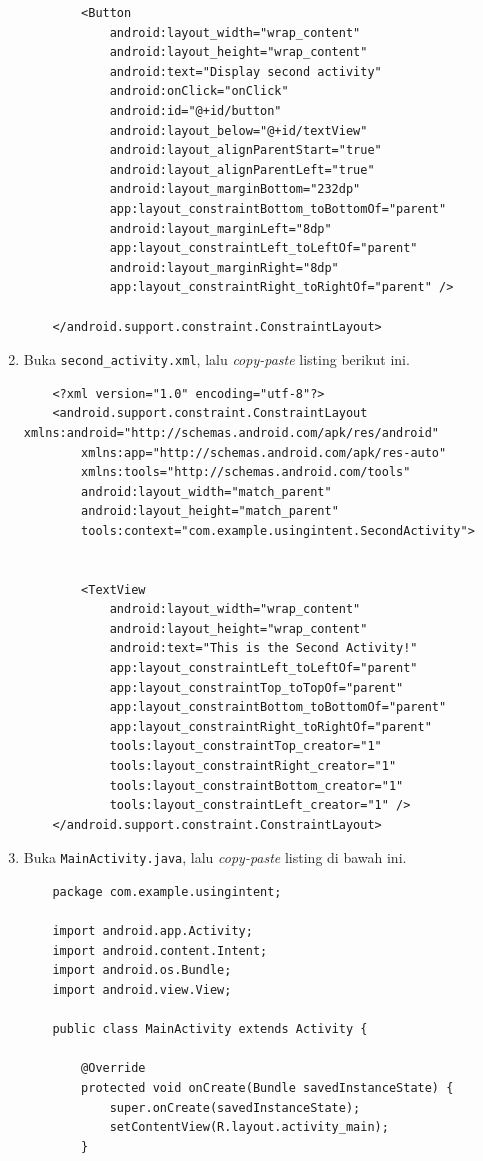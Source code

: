 \documentclass{scrartcl}
\begin{document}
\begin{enumerate}
\begin{verbatim}
		<Button
			android:layout_width="wrap_content"
			android:layout_height="wrap_content"
			android:text="Display second activity"
			android:onClick="onClick"
			android:id="@+id/button"
			android:layout_below="@+id/textView"
			android:layout_alignParentStart="true"
			android:layout_alignParentLeft="true"
			android:layout_marginBottom="232dp"
			app:layout_constraintBottom_toBottomOf="parent"
			android:layout_marginLeft="8dp"
			app:layout_constraintLeft_toLeftOf="parent"
			android:layout_marginRight="8dp"
			app:layout_constraintRight_toRightOf="parent" />
	
	</android.support.constraint.ConstraintLayout>
	\end{verbatim}
	\item Buka \texttt{second\_activity.xml}, lalu \textit{copy-paste} listing berikut ini.
	\begin{verbatim}
	<?xml version="1.0" encoding="utf-8"?>
	<android.support.constraint.ConstraintLayout xmlns:android="http://schemas.android.com/apk/res/android"
		xmlns:app="http://schemas.android.com/apk/res-auto"
		xmlns:tools="http://schemas.android.com/tools"
		android:layout_width="match_parent"
		android:layout_height="match_parent"
		tools:context="com.example.usingintent.SecondActivity">
		
		
		<TextView
			android:layout_width="wrap_content"
			android:layout_height="wrap_content"
			android:text="This is the Second Activity!"
			app:layout_constraintLeft_toLeftOf="parent"
			app:layout_constraintTop_toTopOf="parent"
			app:layout_constraintBottom_toBottomOf="parent"
			app:layout_constraintRight_toRightOf="parent"
			tools:layout_constraintTop_creator="1"
			tools:layout_constraintRight_creator="1"
			tools:layout_constraintBottom_creator="1"
			tools:layout_constraintLeft_creator="1" />
	</android.support.constraint.ConstraintLayout>
	\end{verbatim}
	\item Buka \texttt{MainActivity.java}, lalu \textit{copy-paste} listing di bawah ini.
	\begin{verbatim}
	package com.example.usingintent;
	
	import android.app.Activity;
	import android.content.Intent;
	import android.os.Bundle;
	import android.view.View;
	
	public class MainActivity extends Activity {
		
		@Override
		protected void onCreate(Bundle savedInstanceState) {
			super.onCreate(savedInstanceState);
			setContentView(R.layout.activity_main);
		}
		

\end{verbatim}
\end{enumerate}
\end{document}
